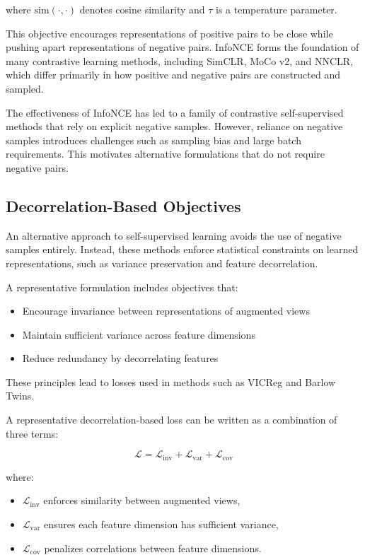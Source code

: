 \documentclass{article}
\begin{document}
where $\text{sim}(\cdot,\cdot)$ denotes cosine similarity and $\tau$ is a temperature parameter.

This objective encourages representations of positive pairs to be close while pushing apart representations of negative pairs. InfoNCE forms the foundation of many contrastive learning methods, including SimCLR, MoCo v2, and NNCLR, which differ primarily in how positive and negative pairs are constructed and sampled.

The effectiveness of InfoNCE has led to a family of contrastive self-supervised methods that rely on explicit negative samples. However, reliance on negative samples introduces challenges such as sampling bias and large batch requirements. This motivates alternative formulations that do not require negative pairs.

\subsection{Decorrelation-Based Objectives}

An alternative approach to self-supervised learning avoids the use of negative samples entirely. Instead, these methods enforce statistical constraints on learned representations, such as variance preservation and feature decorrelation.

A representative formulation includes objectives that:

\begin{itemize}
\item Encourage invariance between representations of augmented views
\item Maintain sufficient variance across feature dimensions
\item Reduce redundancy by decorrelating features
\end{itemize}

These principles lead to losses used in methods such as VICReg and Barlow Twins.

A representative decorrelation-based loss can be written as a combination of three terms:

\begin{equation}
\mathcal{L} = \mathcal{L}_{\text{inv}} + \mathcal{L}_{\text{var}} + \mathcal{L}_{\text{cov}}
\end{equation}

where:
\begin{itemize}
\item $\mathcal{L}_{\text{inv}}$ enforces similarity between augmented views,
\item $\mathcal{L}_{\text{var}}$ ensures each feature dimension has sufficient variance,
\item $\mathcal{L}_{\text{cov}}$ penalizes correlations between feature dimensions.
\end{itemize}
\end{document}
